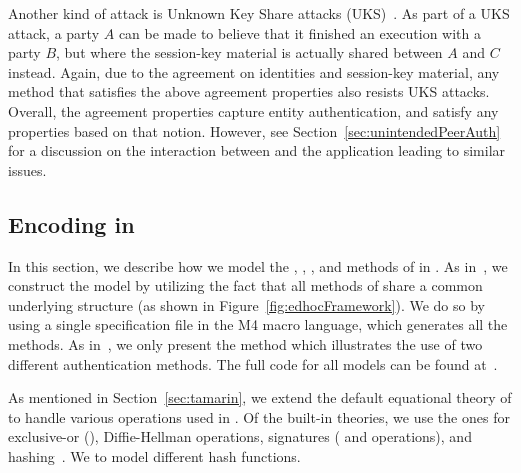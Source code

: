Another kind of attack is Unknown Key Share attacks
(UKS)~\cite{DBLP:conf/ima/Blake-WilsonJM97}.
%
As part of a UKS attack, a party $A$ can be made to believe that it finished
an execution with a party $B$, but where the session-key material is actually
shared between $A$ and $C$ instead.
%
Again, due to the agreement on identities and session-key material, any 
method
that satisfies the above agreement properties also resists UKS attacks.
%
Overall, the agreement properties capture entity authentication,
and satisfy any properties based on that notion.
%
However, see Section~\ref{sec:unintendedPeerAuth} for a discussion on the
interaction between \mEdhoc{} and the application leading to similar issues.
%

\subsection{Encoding \mEdhoc{} in \mTamarin{}}
\label{sec:modeling}
%
In this section, we describe how we model the \mSigSig, \mSigStat, \mStatSig,
and \mStatStat{} methods of \mEdhoc{} in \mTamarin.
%
As in~\cite{Norr21}, we construct the \mTamarin{} model by utilizing the fact
that all methods of \mEdhoc{} share a common underlying structure
(as shown in Figure~\ref{fig:edhocFramework}).
%
We do so by using a single specification file in the M4 macro language,
which generates all the methods.
%
As in~\cite{Norr21}, we only present the \mStatSig{} method which illustrates
the use of two different authentication methods.
%
The full \mTamarin{} code for all models can be found 
at~\cite{edhocTamarinRepo}.
%

As mentioned in Section~\ref{sec:tamarin}, we extend the default
equational theory of \mTamarin{} to handle various operations used in 
\mEdhoc.
%
Of the built-in theories, we use the ones for exclusive-or (\mXor),
Diffie-Hellman operations, signatures ( and  operations),
and 
hashing~\cite{DBLP:conf/csfw/DreierHRS18,DBLP:conf/csfw/SchmidtMCB12}.
%
We 
to
model different hash functions.
%

